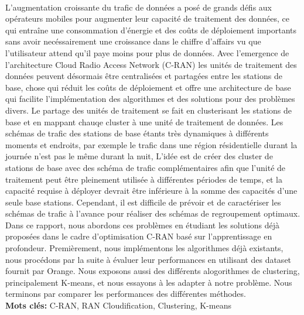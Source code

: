 \documentclass{report}
\begin{document}
    \paragraph{}
  \Large{
    L'augmentation croissante du trafic de données a posé de grands défis aux opérateurs mobiles pour augmenter leur capacité de traitement des données,
    ce qui entraîne une consommation d'énergie et des coûts de déploiement importants sans avoir necéssairement une croissance
    dans le chiffre d'affairs vu que l'utilisateur attend qu'il paye moins pour plus de données. Avec l'emergence de l'architecture Cloud Radio Access Network (C-RAN) 
    les unités de traitement des données peuvent désormais être centralisées et partagées entre les stations de base, chose qui 
    réduit les coûts de déploiement et offre une architecture de base qui facilite l'implémentation des algorithmes et des solutions pour des
    problèmes divers. Le partage des unités de traitement se fait en clusterisant les stations de base et en mappant 
    chauqe cluster à une unité de traitement de données. Les schémas de trafic des stations de base étants très dynamiques à différents moments et endroits,
    par exemple le trafic dans une région résidentielle durant la journée n'est pas le même durant la nuit, L'idée est de créer des
    cluster de stations de base avec des schéma de trafic complémentaires afin que l'unité de traitement peut être pleinement 
    utilisée à différentes périodes de temps, et la capacité requise à déployer devrait être inférieure à la somme des capacités d'une seule base stations. 
    Cependant, il est difficile de prévoir et de caractériser les schémas de trafic à l'avance pour réaliser des schémas de regroupement optimaux.
    Dans ce rapport, nous abordons ces problèmes en étudiant les solutions déjà proposées dans le cadre d'optimisation C-RAN basé sur l'apprentissage en profondeur.
    Premièrement, nous implémentons les algorithmes déjà existants, nous procédons par la suite à évaluer leur performances en utilisant des dataset fournit par Orange. 
    Nous exposons aussi des différents alogorithmes de clustering, principalement K-means, et nous essayons à les adapter à notre problème. 
    Nous terminons par comparer les performances des différentes méthodes. \\[2cm]
  \textbf{Mots clés: }
  C-RAN, RAN Cloudification, Clustering, K-means  
  }
  

  \tableofcontents
   
\end{document}
